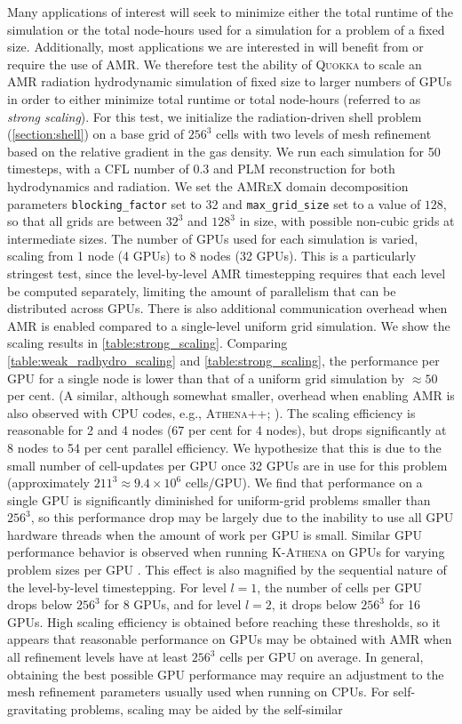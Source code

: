 \documentclass[fleqn,usenatbib]{mnras}
\begin{document}
Many applications of interest will seek to minimize either the total runtime of the simulation or the total node-hours used for a simulation for a problem of a fixed size. Additionally, most applications we are interested in will benefit from or require the use of AMR.  We therefore test the ability of \textsc{Quokka} to scale an AMR radiation hydrodynamic simulation of fixed size to larger numbers of GPUs in order to either minimize total runtime or total node-hours (referred to as \emph{strong scaling}). For this test, we initialize the radiation-driven shell problem (\autoref{section:shell}) on a base grid of $256^3$ cells with two levels of mesh refinement based on the relative gradient in the gas density. We run each simulation for 50 timesteps, with a CFL number of $0.3$ and PLM reconstruction for both hydrodynamics and radiation. We set the \textsc{AMReX} domain decomposition parameters \texttt{blocking\_factor} set to 32 and \texttt{max\_grid\_size} set to a value of $128$, so that all grids are between $32^3$ and $128^3$ in size, with possible non-cubic grids at intermediate sizes. The number of GPUs used for each simulation is varied, scaling from 1 node (4 GPUs) to 8 nodes (32 GPUs). This is a particularly stringest test, since the level-by-level AMR timestepping requires that each level be computed separately, limiting the amount of parallelism that can be distributed across GPUs. There is also additional communication overhead when AMR is enabled compared to a single-level uniform grid simulation. We show the scaling results in \autoref{table:strong_scaling}. Comparing \autoref{table:weak_radhydro_scaling} and \autoref{table:strong_scaling}, the performance per GPU for a single node is lower than that of a uniform grid simulation by $\approx 50$ per cent. (A similar, although somewhat smaller, overhead when enabling AMR is also observed with CPU codes, e.g., \textsc{Athena++}; \citealt{Stone_2020}). The scaling efficiency is reasonable for 2 and 4 nodes (67 per cent for 4 nodes), but drops significantly at 8 nodes to 54 per cent parallel efficiency. We hypothesize that this is due to the small number of cell-updates per GPU once 32 GPUs are in use for this problem (approximately $211^3 \approx 9.4 \times 10^6$ cells/GPU). We find that performance on a single GPU is significantly diminished for uniform-grid problems smaller than $256^3$, so this performance drop may be largely due to the inability to use all GPU hardware threads when the amount of work per GPU is small. Similar GPU performance behavior is observed when running \textsc{K-Athena} on GPUs for varying problem sizes per GPU \citep{Grete_2019}. This effect is also magnified by the sequential nature of the level-by-level timestepping. For level $l=1$, the number of cells per GPU drops below $256^3$ for 8 GPUs, and for level $l=2$, it drops below $256^3$ for 16 GPUs. High scaling efficiency is obtained before reaching these thresholds, so it appears that reasonable performance on GPUs may be obtained with AMR when all refinement levels have at least $256^3$ cells per GPU on average. In general, obtaining the best possible GPU performance may require an adjustment to the mesh refinement parameters usually used when running on CPUs. For self-gravitating problems, scaling may be aided by the self-similar 
\end{document}
